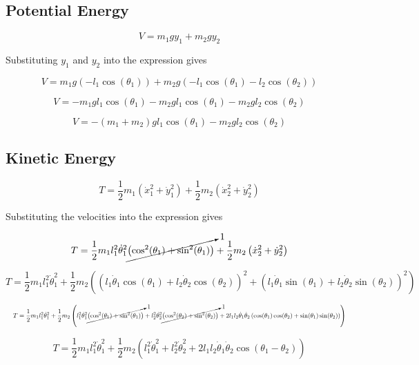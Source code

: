 \documentclass[11pt,a4paper,fleqn]{article}
\begin{document}
\newpage

\subsection{Potential Energy}

\[
    V = m_1 g y_1 + m_2 g y_2
\]

Substituting \(y_1\) and \(y_2\) into the expression gives

\[
    V = m_1 g \left(-l_1 \cos(\theta_1)\right)
    + m_2 g \left(-l_1 \cos(\theta_1) - l_2 \cos(\theta_2)\right)
\]

\[
    V = -m_1 g l_1 \cos(\theta_1)
    - m_2 g l_1 \cos(\theta_1)
    - m_2 g l_2 \cos(\theta_2)
\]

\[
    V = -(m_1 + m_2)g l_1 \cos(\theta_1)
    - m_2 g l_2 \cos(\theta_2)
\]

\subsection{Kinetic Energy}

\[
    T = \frac{1}{2}m_1\left(\dot{x}_1^2 + \dot{y}_1^2\right)
    + \frac{1}{2}m_2\left(\dot{x}_2^2 + \dot{y}_2^2\right)
\]

Substituting the velocities into the expression gives

\[
    T = \frac{1}{2}m_1 l_1^2 \dot{\theta}_1^2
    \cancelto{1}{\left(\cos^2(\theta_1) + \sin^2(\theta_1)\right)}
    + \frac{1}{2}m_2\left(\dot{x}_2^2 + \dot{y}_2^2\right)
\]

\[
    T = \frac{1}{2}m_1 l_1^2 \dot{\theta}_1^2
    + \frac{1}{2}m_2\left(
    \left(l_1 \dot{\theta}_1 \cos(\theta_1)
    + l_2 \dot{\theta}_2 \cos(\theta_2)\right)^2
    + \left(l_1 \dot{\theta}_1 \sin(\theta_1)
    + l_2 \dot{\theta}_2 \sin(\theta_2)\right)^2
    \right)
\]

\[
    \resizebox{\textwidth}{!}{$\displaystyle
    T = \frac{1}{2}m_1 l_1^2 \dot{\theta}_1^2
    + \frac{1}{2}m_2\left(
    l_1^2 \dot{\theta}_1^2
    \cancelto{1}{\left(\cos^2(\theta_1) + \sin^2(\theta_1)\right)}
    + l_2^2 \dot{\theta}_2^2
    \cancelto{1}{\left(\cos^2(\theta_2) + \sin^2(\theta_2)\right)}
    + 2l_1l_2\dot{\theta}_1\dot{\theta}_2
    \left(\cos(\theta_1)\cos(\theta_2)
    + \sin(\theta_1)\sin(\theta_2)\right)
    \right)$}
\]

\[
    T = \frac{1}{2}m_1 l_1^2 \dot{\theta}_1^2
    + \frac{1}{2}m_2\left(
    l_1^2 \dot{\theta}_1^2
    + l_2^2 \dot{\theta}_2^2
    + 2l_1l_2\dot{\theta}_1\dot{\theta}_2
    \cos(\theta_1 - \theta_2)
    \right)
\]
\end{document}
